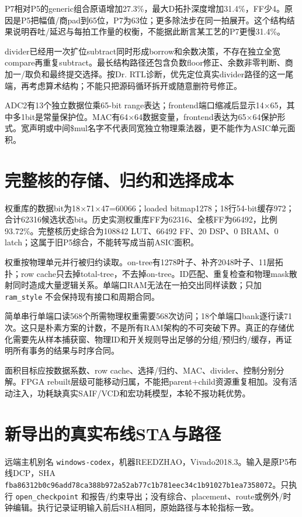 \documentclass[UTF8,fontset=fandol,10pt,a4paper,openany]{ctexrep}
\newcommand{\code}[1]{\nolinkurl{#1}}
\begin{document}
P7相对P5的generic组合原语增加27.3\%，最大D拓扑深度增加31.4\%，FF少4。原因是P5把幅值/商pad到65位，P7为63位；更多除法步在同一拍展开。这个结构结果说明吞吐/延迟与每拍工作量的权衡，不能据此断言某工艺的P7更慢31.4\%。


divider已经用一次扩位subtract同时形成borrow和余数决策，不存在独立全宽compare再重复subtract。最长结构路径还包含负数floor修正、余数非零判断、商加一/取负和最终提交选择。按Dr. RTL诊断，优先定位真实divider路径的这一尾端，再考虑算术结构；不能只把源码循环拆开或随意删符号修正。


ADC2有13个独立数据位乘65-bit range表达；frontend端口缩减后显示14\ensuremath{\times}65，其中多1bit是常量保护位。MAC有64\ensuremath{\times}64数据变量，frontend表达为65\ensuremath{\times}64保护形式。宽声明或中间\$mul名字不代表同宽独立物理乘法器，更不能作为ASIC单元面积。


\section{完整核的存储、归约和选择成本}


权重库的数据bit为18\ensuremath{\times}71\ensuremath{\times}47=60066；loaded bitmap1278；18行54-bit缓存972；合计62316候选状态bit。历史实测权重库FF为62316、全核FF为66492，比例93.72\%。完整核历史综合为108842 LUT、66492 FF、20 DSP、0 BRAM、0 latch；这属于旧P5综合，不能转写成当前ASIC面积。


权重按物理单元并行被归约读取。on-tree有1278叶子、补齐2048叶子、11层拓扑；row cache只去掉total-tree，不去掉on-tree。ID匹配、重复检查和物理mask散射同时造成大量逻辑关系。单端口RAM无法在一拍交出同样读数；只加 \code{ram_style} 不会保持现有接口和周期合同。


简单串行单端口读568个所需物理权重需要568次访问；18个单端口bank逐行读71次。这只是朴素方案的计数，不是所有RAM架构的不可突破下界。真正的存储优化需要先从样本捕获窗、物理ID和开关规则导出足够的分组/预归约/缓存，再证明所有事务的结果与时序合同。


面积目标应按数据系数、row cache、选择/归约、MAC、divider、控制分别分解。FPGA rebuilt层级可能移动归属，不能把parent+child资源重复相加。没有活动注入，功耗缺真实SAIF/VCD和宏功耗模型，本轮不报功耗优势。


\section{新导出的真实布线STA与路径}


远端主机别名 \code{windows-codex}，机器REEDZHAO，Vivado2018.3。输入是原P5布线DCP，SHA \code{fba86312b0c96add78ca388b972a52ab77c1b781eec34c1b91027b1ea7358072}。只执行 \code{open_checkpoint} 和报告/约束导出；没有综合、placement、route或例外/时钟编辑。执行记录证明输入前后SHA相同，原始路径与本轮指标一致。
\end{document}
